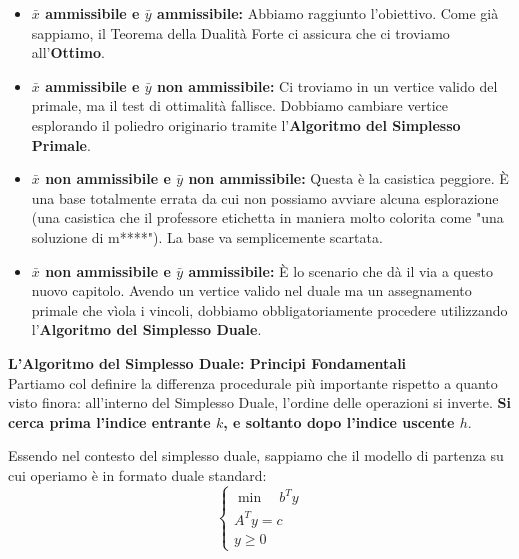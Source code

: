 \documentclass[12pt, a4paper]{article}
\begin{document}
	\begin{itemize}[label=\textcolor{titlecolor}{\Large\textbullet}, itemsep=6pt, leftmargin=1.5cm]
		\item \textbf{$\bar{x}$ ammissibile e $\bar{y}$ ammissibile:} Abbiamo raggiunto l'obiettivo. Come già sappiamo, il Teorema della Dualità Forte ci assicura che ci troviamo all'\textbf{Ottimo}.
		
		\item \textbf{$\bar{x}$ ammissibile e $\bar{y}$ non ammissibile:} Ci troviamo in un vertice valido del primale, ma il test di ottimalità fallisce. Dobbiamo cambiare vertice esplorando il poliedro originario tramite l'\textbf{Algoritmo del Simplesso Primale}.
		
		\item \textbf{$\bar{x}$ non ammissibile e $\bar{y}$ non ammissibile:} Questa è la casistica peggiore. È una base totalmente errata da cui non possiamo avviare alcuna esplorazione (una casistica che il professore etichetta in maniera molto colorita come "una soluzione di m****"). La base va semplicemente scartata.
		
		\item \textbf{$\bar{x}$ non ammissibile e $\bar{y}$ ammissibile:} È lo scenario che dà il via a questo nuovo capitolo. Avendo un vertice valido nel duale ma un assegnamento primale che vìola i vincoli, dobbiamo obbligatoriamente procedere utilizzando l'\textbf{Algoritmo del Simplesso Duale}.
	\end{itemize}
	
	\vspace{0.6cm}
	\textbf{L'Algoritmo del Simplesso Duale: Principi Fondamentali}\\
	Partiamo col definire la differenza procedurale più importante rispetto a quanto visto finora: all'interno del Simplesso Duale, l'ordine delle operazioni si inverte. \textbf{Si cerca prima l'indice entrante $k$, e soltanto dopo l'indice uscente $h$}.
	
	Essendo nel contesto del simplesso duale, sappiamo che il modello di partenza su cui operiamo è in formato duale standard:
	\[
	\begin{cases}
		\min \quad b^T y \\[6pt]
		A^T y = c \\
		y \geq 0
	\end{cases}
	\]
	
\end{document}
